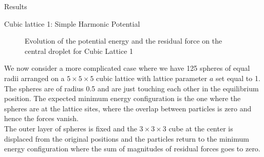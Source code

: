 \documentclass[12pt]{article}
\begin{document}
\begin{section}{Results}
\begin{subsection}{Cubic lattice 1: Simple Harmonic Potential}
\begin{figure}[h!]
\begin{subfigure}{0.5\textwidth}
    \end{subfigure}
    \caption{Evolution of the potential energy and the residual force on the central droplet for Cubic Lattice 1}
\end{figure}
\noindent We now consider a more complicated case where we have 125 spheres of equal radii arranged on a $5 \times 5 \times 5$ cubic lattice with lattice parameter $a$ set equal to 1. The spheres are of radius 0.5 and are just touching each other in the equilibrium position. The expected minimum energy configuration is the one where the spheres are at the lattice sites, where the overlap between particles is zero and hence the forces vanish.\\ The outer layer of spheres is fixed and the $3 \times 3 \times 3$ cube at the center is displaced from the original positions and the particles return to the minimum energy configuration where the sum of magnitudes of residual forces goes to zero. 
\end{subsection}


\end{section}
\end{document}
